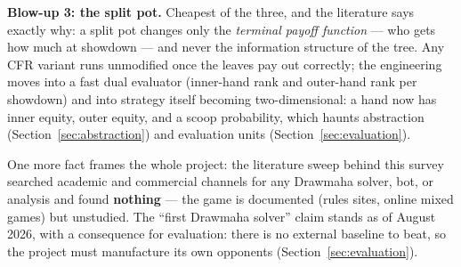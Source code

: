 \textbf{Blow-up 3: the split pot.} Cheapest of the three, and the literature says exactly why: a split pot changes only the \emph{terminal payoff function} --- who gets how much at showdown --- and never the information structure of the tree. Any CFR variant runs unmodified once the leaves pay out correctly; the engineering moves into a fast dual evaluator (inner-hand rank and outer-hand rank per showdown) and into strategy itself becoming two-dimensional: a hand now has inner equity, outer equity, and a scoop probability, which haunts abstraction (Section~\ref{sec:abstraction}) and evaluation units (Section~\ref{sec:evaluation}).

One more fact frames the whole project: the literature sweep behind this survey searched academic and commercial channels for any Drawmaha solver, bot, or analysis and found \textbf{nothing} --- the game is documented (rules sites, online mixed games) but unstudied. The ``first Drawmaha solver'' claim stands as of August 2026, with a consequence for evaluation: there is no external baseline to beat, so the project must manufacture its own opponents (Section~\ref{sec:evaluation}).
